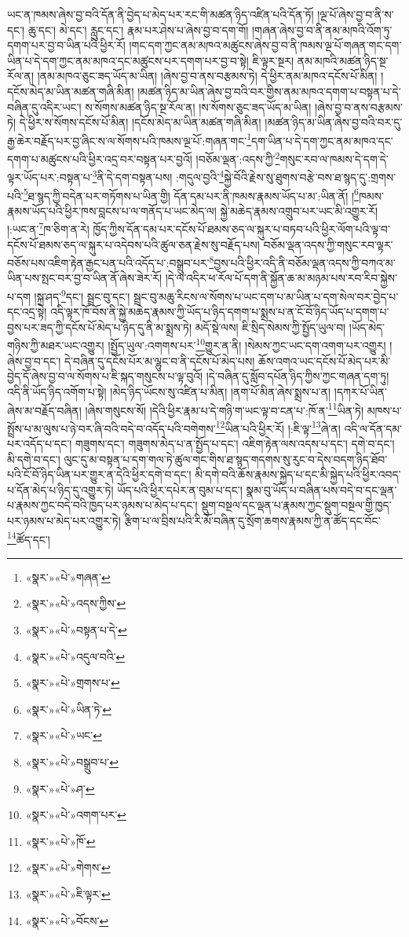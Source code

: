 ཡང་ན་ཁམས་ཞེས་བྱ་བའི་དོན་ནི་བྱེད་པ་མེད་པར་རང་གི་མཚན་ཉིད་འཛིན་པའི་དོན་ཏོ། །ལྔ་པོ་ཞེས་བྱ་བ་ནི་ས་དང་། ཆུ་དང་། མེ་དང་། རླུང་དང་། རྣམ་པར་ཤེས་པ་ཞེས་བྱ་བ་དག་གོ། །གཞན་ཞེས་བྱ་བ་ནི་ནམ་མཁའི་འོག་ཏུ་དགག་པར་བྱ་བ་ཡིན་པའི་ཕྱིར་རོ། །གང་དག་ཀྱང་ནམ་མཁའ་མཚུངས་ཞེས་བྱ་བ་ནི་ཁམས་ལྔ་པོ་གཞན་གང་དག་ཡིན་པ་དེ་དག་ཀྱང་ནམ་མཁའ་དང་མཚུངས་པར་དགག་པར་བྱ་བ་སྟེ། ཇི་ལྟར་སྔར། ནམ་མཁའི་མཚན་ཉིད་སྔ་རོལ་ན། །ནམ་མཁའ་ཅུང་ཟད་ཡོད་མ་ཡིན། །ཞེས་བྱ་བ་ནས་བརྩམས་ཏེ། དེ་ཕྱིར་ནམ་མཁའ་དངོས་པོ་མིན། །དངོས་མེད་མ་ཡིན་མཚན་གཞི་མིན། །མཚན་ཉིད་མ་ཡིན་ཞེས་བྱ་བའི་བར་གྱིས་ནམ་མཁའ་དགག་པ་བསྟན་པ་དེ་བཞིན་དུ་འདིར་ཡང་། ས་སོགས་མཚན་ཉིད་སྔ་རོལ་ན། །ས་སོགས་ཅུང་ཟད་ཡོད་མ་ཡིན། །ཞེས་བྱ་བ་ནས་བརྩམས་ཏེ། དེ་ཕྱིར་ས་སོགས་དངོས་པོ་མིན། །དངོས་མེད་མ་ཡིན་མཚན་གཞི་མིན། །མཚན་ཉིད་མ་ཡིན་ཞེས་བྱ་བའི་བར་དུ་རྒྱ་ཆེར་བརྗོད་པར་བྱ་ཞིང་ས་ལ་སོགས་པའི་ཁམས་ལྔ་པོ་:གཞན་གང་\footnote{«སྣར་»«པེ་»གཞན་}དག་ཡིན་པ་དེ་དག་ཀྱང་ནམ་མཁའ་དང་དགག་པ་མཚུངས་པའི་ཕྱིར་འདྲ་བར་བསྟན་པར་བྱའོ། །བཅོམ་ལྡན་:འདས་ཀྱི་\footnote{«སྣར་»«པེ་»འདས་ཀྱིས་}གསུང་རབ་ལ་ཁམས་དེ་དག་དེ་ལྟར་ཡོད་པར་:བསྟན་པ་\footnote{«སྣར་»«པེ་»བསྟན་པ་དེ་}ནི་དེ་དག་བསྟན་པས། :གདུལ་བྱའི་\footnote{«སྣར་»«པེ་»འདུལ་བའི་}སྐྱེ་བོའི་རྗེས་སུ་ཐུགས་བརྩེ་བས་ཐ་སྙད་དུ་:གྲགས་པའི་\footnote{«སྣར་»«པེ་»གྲགས་པ་}ཐ་སྙད་ཀྱི་བདེན་པར་གཏོགས་པ་ཡིན་གྱི། དོན་དམ་པར་ནི་ཁམས་རྣམས་ཡོད་པ་མ་:ཡིན་ནོ། །\footnote{«སྣར་»«པེ་»ཡིན་ཏེ་}ཁམས་རྣམས་ཡོད་པའི་ཕྱིར་ཁས་བླངས་པ་ལ་གནོད་པ་ཡང་མེད་ལ། སྐྱེ་མཆེད་རྣམས་འགྲུབ་པར་ཡང་མི་འགྱུར་རོ། །:ཡང་ན་\footnote{«སྣར་»«པེ་»ཡང་}ཁ་ཅིག་ན་རེ། ཁྱོད་ཀྱིས་དོན་དམ་པར་དངོས་པོ་ཐམས་ཅད་ལ་སྐུར་པ་བཏབ་པའི་ཕྱིར་ལོག་པའི་ལྟ་བ་དངོས་པོ་ཐམས་ཅད་ལ་སྐུར་པ་འདེབས་པའི་ཚུལ་ཅན་རྗེས་སུ་བརྗོད་པས། བཅོམ་ལྡན་འདས་ཀྱི་གསུང་རབ་ལྟར་བཅོས་པས་འཇིག་རྟེན་རྒྱང་པན་པའི་འདོད་པ་:བསྒྲུབ་པར་\footnote{«སྣར་»«པེ་»བསྒྲུབ་པ་}བྱས་པའི་ཕྱིར་འདི་ནི་བཅོམ་ལྡན་འདས་ཀྱི་བཀའ་མ་ཡིན་པས་སྤང་བར་བྱ་བ་ཡིན་ནོ་ཞེས་ཟེར་རོ། །དེ་ལ་འདིར་ཕ་རོལ་པོ་དག་ནི་སྐྱོན་ཆ་མ་མཉམ་པས་རབ་རིབ་སྐྱེས་པ་དག །སྐྲ་ཤད་\footnote{«སྣར་»«པེ་»ཤ་}དང་། སྦྲང་བུ་དང་། སྦྲང་བུ་མཆུ་རིངས་ལ་སོགས་པ་ཡང་དག་པ་མ་ཡིན་པ་དག་སེལ་བར་བྱེད་པ་དང་འདྲ་སྟེ། འདི་ལྟར་ཁོ་བོས་ནི་སྐྱེ་མཆེད་རྣམས་ཀྱི་ཡོད་པ་ཉིད་དགག་པ་སྨྲས་པ་ན་ངོ་བོ་ཉིད་ཡོད་པ་དགག་པ་བྱས་པར་ཟད་ཀྱི་དངོས་པོ་མེད་པ་ཉིད་དུ་ནི་མ་སྨྲས་ཏེ། མདོ་སྡེ་ལས། ཇི་སྲིད་སེམས་ཀྱི་སྤྱོད་ཡུལ་བ། །ཡོད་མེད་གཉིས་ཀྱི་མཐར་ཡང་འགྱུར། །སྤྱོད་ཡུལ་:འགགས་པར་\footnote{«སྣར་»«པེ་»འགག་པར་}གྱུར་ན་ནི། །སེམས་ཀྱང་ཡང་དག་འགག་པར་འགྱུར། །ཞེས་བྱ་བ་དང་། དེ་བཞིན་དུ་དངོས་པོར་མ་ལྷུང་བ་ནི་དངོས་པོ་མེད་པས། ཆོས་འགའ་ཡང་དངོས་པོ་མེད་པར་མི་བྱེད་དོ་ཞེས་བྱ་བ་ལ་སོགས་པ་ཇི་སྐད་གསུངས་པ་ལྟ་བུའོ། །དེ་བཞིན་དུ་སློབ་དཔོན་ཉིད་ཀྱིས་ཀྱང་གཞན་དག་ཏུ། འདི་ནི་ཡོད་ཉིད་འགོག་པ་སྟེ། །མེད་ཉིད་ཡོངས་སུ་འཛིན་པ་མིན། །ནག་པོ་མིན་ཞེས་སྨྲས་པ་ན། །དཀར་པོ་ཡིན་ཞེས་མ་བརྗོད་བཞིན། །ཞེས་གསུངས་སོ། །དེའི་ཕྱིར་རྣམ་པ་དེ་གཉི་ག་ཡང་ལྟ་བ་ངན་པ་:ཁོ་ན་\footnote{«སྣར་»«པེ་»ཁོ་}ཡིན་ཏེ། མཁས་པ་སྤྲོས་པ་མ་ལུས་པ་ཉེ་བར་ཞི་བའི་བདེ་བ་འདོད་པའི་བགེགས་\footnote{«སྣར་»«པེ་»གེགས་}ཡིན་པའི་ཕྱིར་རོ། །:ཇི་ལྟ་\footnote{«སྣར་»«པེ་»ཇི་ལྟར་}ཞེ་ན། འདི་ལ་དོན་དམ་པར་འདོད་པ་དང་། གཟུགས་དང་། གཟུགས་མེད་པ་ན་སྤྱོད་པ་དང་། འཇིག་རྟེན་ལས་འདས་པ་དང་། དགེ་བ་དང་། མི་དགེ་བ་དང་། ལུང་དུ་མ་བསྟན་པ་དག་གལ་ཏེ་ཚུལ་གང་གིས་ཐ་སྙད་གདགས་སུ་རུང་བ་དེས་བདག་ཉིད་ཐོབ་པའི་ངོ་བོ་ཉིད་ཡིན་པར་གྱུར་ན་དེའི་ཕྱིར་དགེ་བ་དང་། མི་དགེ་བའི་ཆོས་རྣམས་སྐྱེད་པ་དང་མི་སྐྱེད་པའི་ཕྱིར་འབད་པ་དོན་མེད་པ་ཉིད་དུ་འགྱུར་ཏེ། ཡོད་པའི་ཕྱིར་དཔེར་ན་བུམ་པ་དང་། སྣམ་བུ་ཡོད་པ་བཞིན་པས་བདེ་བ་དང་ལྡན་པ་རྣམས་ཀྱང་བདེ་བའི་ཁྱད་པར་ཉམས་པ་མེད་པ་དང་། སྡུག་བསྔལ་དང་ལྡན་པ་རྣམས་ཀྱང་སྡུག་བསྔལ་གྱི་ཁྱད་པར་ཉམས་པ་མེད་པར་འགྱུར་ཏེ། རྩིག་པ་ལ་བྲིས་པའི་རི་མོ་བཞིན་དུ་སྲོག་ཆགས་རྣམས་ཀྱི་ན་ཚོད་དང་བོང་\footnote{«སྣར་»«པེ་»བོངས་}ཚོད་དང་། 